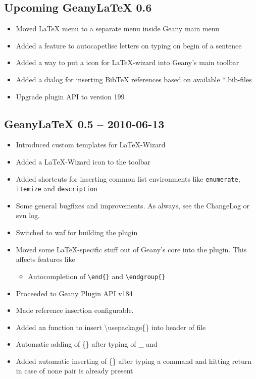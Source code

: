 \documentclass[%
paper=a4,%
fontsize=11pt,%
twoside=false,%
DIV18,%
headsepline,%
plainheadsepline,%
footsepline,%
plainfootsepline,%
bibliography=totoc,%
listof=totoc,%
BCOR10mm,%
parskip=half,%
openany,%
]{scrartcl}
\begin{document}
\subsection{Upcoming Geany\LaTeX{} 0.6}
\begin{itemize}
	\item Moved \LaTeX{} menu to a separate menu inside Geany main menu
	\item Added a feature to autocapetlise letters on typing on begin of
		  a sentence
	\item Added a way to put a icon for \LaTeX{}-wizard into Geany's main
		  toolbar
	\item Added a dialog for inserting BibTeX references based on
		  available *.bib-files
	\item Upgrade plugin API to version 199
\end{itemize}

\subsection{Geany\LaTeX{} 0.5 -- 2010-06-13}
\begin{itemize}

	\item Introduced custom templates for \LaTeX-Wizard
	\item Added a \LaTeX-Wizard icon to the toolbar
	\item Added shortcuts for inserting common list environments
		  like \texttt{enumerate}, \texttt{itemize} and
		  \texttt{description}
	\item Some general bugfixes and improvements. As always, see the
		  ChangeLog or svn log.
	\item Switched to waf for building the plugin
	\item Moved some \LaTeX{}-specific stuff out of Geany's core into the
		  plugin. This affects features like
			\begin{itemize}
				\item Autocompletion of \texttt{\textbackslash{}end\{\}}
					and \texttt{\textbackslash{}endgroup\{\}}
			\end{itemize}
	\item Proceeded to Geany Plugin API v184
	\item Made reference insertion configurable.
	\item Added an function to insert \textbackslash{}usepackage\{\} into
		  header of file
	\item Automatic adding of \{\} after typing of \_{} and 
	\item Added automatic inserting of \{\} after typing a command and
		  hitting return in case of none pair is already present

\end{itemize}
\end{document}
